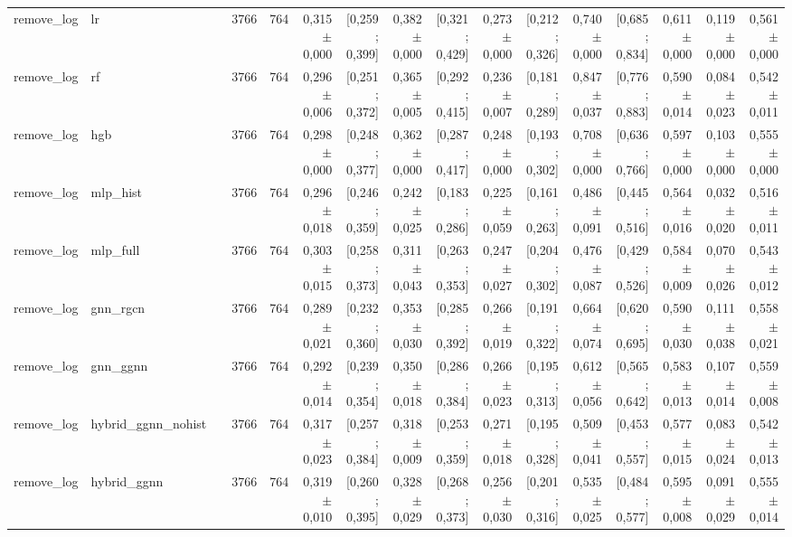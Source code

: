 \begin{table}[htbp]
{\begin{tabular}{llrrrrrrrrrrrrrr}
remove\_log & lr &  & 3766 & 764 & 0,315 $\pm$ 0,000 & [0,259 ; 0,399] & 0,382 $\pm$ 0,000 & [0,321 ; 0,429] & 0,273 $\pm$ 0,000 & [0,212 ; 0,326] & 0,740 $\pm$ 0,000 & [0,685 ; 0,834] & 0,611 $\pm$ 0,000 & 0,119 $\pm$ 0,000 & 0,561 $\pm$ 0,000 \\
remove\_log & rf &  & 3766 & 764 & 0,296 $\pm$ 0,006 & [0,251 ; 0,372] & 0,365 $\pm$ 0,005 & [0,292 ; 0,415] & 0,236 $\pm$ 0,007 & [0,181 ; 0,289] & 0,847 $\pm$ 0,037 & [0,776 ; 0,883] & 0,590 $\pm$ 0,014 & 0,084 $\pm$ 0,023 & 0,542 $\pm$ 0,011 \\
remove\_log & hgb &  & 3766 & 764 & 0,298 $\pm$ 0,000 & [0,248 ; 0,377] & 0,362 $\pm$ 0,000 & [0,287 ; 0,417] & 0,248 $\pm$ 0,000 & [0,193 ; 0,302] & 0,708 $\pm$ 0,000 & [0,636 ; 0,766] & 0,597 $\pm$ 0,000 & 0,103 $\pm$ 0,000 & 0,555 $\pm$ 0,000 \\
remove\_log & mlp\_hist &  & 3766 & 764 & 0,296 $\pm$ 0,018 & [0,246 ; 0,359] & 0,242 $\pm$ 0,025 & [0,183 ; 0,286] & 0,225 $\pm$ 0,059 & [0,161 ; 0,263] & 0,486 $\pm$ 0,091 & [0,445 ; 0,516] & 0,564 $\pm$ 0,016 & 0,032 $\pm$ 0,020 & 0,516 $\pm$ 0,011 \\
remove\_log & mlp\_full &  & 3766 & 764 & 0,303 $\pm$ 0,015 & [0,258 ; 0,373] & 0,311 $\pm$ 0,043 & [0,263 ; 0,353] & 0,247 $\pm$ 0,027 & [0,204 ; 0,302] & 0,476 $\pm$ 0,087 & [0,429 ; 0,526] & 0,584 $\pm$ 0,009 & 0,070 $\pm$ 0,026 & 0,543 $\pm$ 0,012 \\
remove\_log & gnn\_rgcn &  & 3766 & 764 & 0,289 $\pm$ 0,021 & [0,232 ; 0,360] & 0,353 $\pm$ 0,030 & [0,285 ; 0,392] & 0,266 $\pm$ 0,019 & [0,191 ; 0,322] & 0,664 $\pm$ 0,074 & [0,620 ; 0,695] & 0,590 $\pm$ 0,030 & 0,111 $\pm$ 0,038 & 0,558 $\pm$ 0,021 \\
remove\_log & gnn\_ggnn &  & 3766 & 764 & 0,292 $\pm$ 0,014 & [0,239 ; 0,354] & 0,350 $\pm$ 0,018 & [0,286 ; 0,384] & 0,266 $\pm$ 0,023 & [0,195 ; 0,313] & 0,612 $\pm$ 0,056 & [0,565 ; 0,642] & 0,583 $\pm$ 0,013 & 0,107 $\pm$ 0,014 & 0,559 $\pm$ 0,008 \\
remove\_log & hybrid\_ggnn\_nohist &  & 3766 & 764 & 0,317 $\pm$ 0,023 & [0,257 ; 0,384] & 0,318 $\pm$ 0,009 & [0,253 ; 0,359] & 0,271 $\pm$ 0,018 & [0,195 ; 0,328] & 0,509 $\pm$ 0,041 & [0,453 ; 0,557] & 0,577 $\pm$ 0,015 & 0,083 $\pm$ 0,024 & 0,542 $\pm$ 0,013 \\
remove\_log & hybrid\_ggnn &  & 3766 & 764 & 0,319 $\pm$ 0,010 & [0,260 ; 0,395] & 0,328 $\pm$ 0,029 & [0,268 ; 0,373] & 0,256 $\pm$ 0,030 & [0,201 ; 0,316] & 0,535 $\pm$ 0,025 & [0,484 ; 0,577] & 0,595 $\pm$ 0,008 & 0,091 $\pm$ 0,029 & 0,555 $\pm$ 0,014 \\

\end{tabular}}
\end{table}
